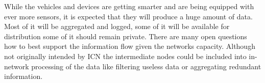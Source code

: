\vspace{5mm} %

While the vehicles and devices are getting smarter and are being equipped with ever more sensors, it is expected that they will produce a huge amount of data. Most of it will be aggregated and logged, some of it will be available for distribution some of it should remain private. There are many open questions how to best support the information flow given the networks capacity. Although not originally intended by ICN the intermediate nodes could be included into in-network processing of the data like filtering useless data or aggregating redundant information.